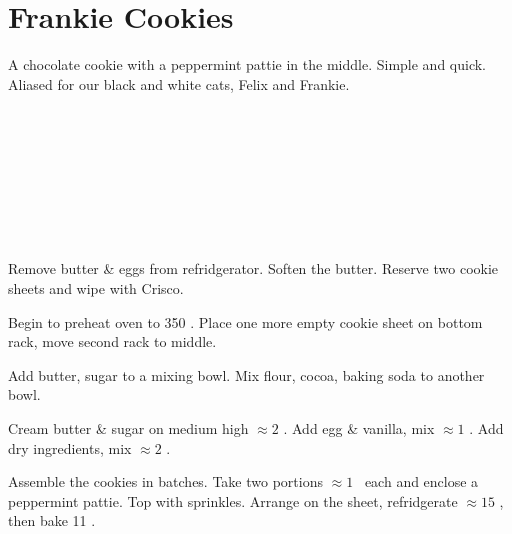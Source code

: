 \section{Frankie Cookies}


\begin{recipestats}[
	servings=20 cookies,
	preptime=30 \minute,
	bakingtime=11 \minute,
	source=\citetitle{entenmanns2011} \cite{entenmanns2011},
]
\end{recipestats}


\begin{recipeabstract}
	A chocolate cookie with a peppermint pattie in the middle.
	Simple and quick.
	Aliased for our black and white cats, Felix and Frankie.
\end{recipeabstract}


\begin{ingredientcolumns}[1]
	\begin{ingredientblock}
		\\
		\\
		\\
		\\
		\\
		\\
		\\
	\end{ingredientblock}
\end{ingredientcolumns}


\begin{preparation}
\item Remove butter \& eggs from refridgerator.
	Soften the butter.
	Reserve two cookie sheets and wipe with Crisco.

\item Begin to preheat oven to 350 \Fahrenheit.
	Place one more empty cookie sheet on bottom rack, move second rack to middle.

\item Add butter, sugar to a mixing bowl.
	Mix flour, cocoa, baking soda to another bowl.

\item Cream butter \& sugar on medium high $\approx 2$ \minute.
	Add egg \& vanilla, mix $\approx 1$ \minute.
	Add dry ingredients, mix $\approx 2$ \minute.

\item Assemble the cookies in batches.
	Take two portions $\approx 1$ \Tablespoon~each and enclose a peppermint pattie.
	Top with sprinkles.
	Arrange on the sheet, refridgerate $\approx 15$ \minute, then bake 11 \minute.
\end{preparation}



